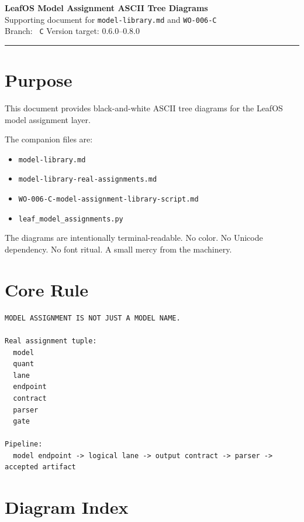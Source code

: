 \documentclass[11pt]{article}
\newcommand{\leafrule}{\vspace{0.4em}\hrule\vspace{0.8em}}
\begin{document}
\begin{center}
{\Huge \textbf{LeafOS Model Assignment ASCII Tree Diagrams}}\\[0.5em]
{\large Supporting document for \texttt{model-library.md} and \texttt{WO-006-C}}\\[0.4em]
{\normalsize Branch: \texttt{\string~C} \quad Version target: 0.6.0--0.8.0}
\end{center}

\leafrule

\section{Purpose}

This document provides black-and-white ASCII tree diagrams for the LeafOS model assignment layer.

The companion files are:

\begin{itemize}
  \item \texttt{model-library.md}
  \item \texttt{model-library-real-assignments.md}
  \item \texttt{WO-006-C-model-assignment-library-script.md}
  \item \texttt{leaf\_model\_assignments.py}
\end{itemize}

The diagrams are intentionally terminal-readable. No color. No Unicode dependency. No font ritual. A small mercy from the machinery.

\section{Core Rule}

\begin{Verbatim}[fontsize=\small, frame=single]
MODEL ASSIGNMENT IS NOT JUST A MODEL NAME.

Real assignment tuple:
  model
  quant
  lane
  endpoint
  contract
  parser
  gate

Pipeline:
  model endpoint -> logical lane -> output contract -> parser -> accepted artifact
\end{Verbatim}

\section{Diagram Index}
\end{document}
